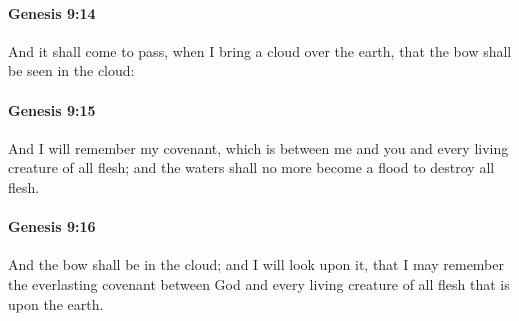 		\paragraph{Genesis 9:14} %
			\label{GENESIS-9-14}

			And it shall come to pass, when I bring a cloud over the earth, that the bow shall be seen in the cloud:


		\paragraph{Genesis 9:15} %
			\label{GENESIS-9-15}

			And I will remember my covenant, which is between me and you and every living creature of all flesh; and the waters shall no more become a flood to destroy all flesh.


		\paragraph{Genesis 9:16} %
			\label{GENESIS-9-16}

			And the bow shall be in the cloud; and I will look upon it, that I may remember the everlasting covenant between God and every living creature of all flesh that is upon the earth.


